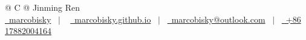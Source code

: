 \documentclass[a4paper,11pt]{article}
\begin{document}
\pagestyle{empty} 


\begin{tabularx}{\linewidth}{@{} C @{}}
\Huge{Jinming Ren} \\[7.5pt]
\href{https://github.com/marcobisky}{\raisebox{-0.05\height}\faGithub\ marcobisky} \ $|$ \ 
\href{https://marcobisky.github.io}{\raisebox{-0.05\height}\faGlobe \ marcobisky.github.io} \ $|$ \ 
\href{mailto:marcobisky@outlook.com}{\raisebox{-0.05\height}\faEnvelope \ marcobisky@outlook.com} \ $|$ \ 
\href{tel:+86 17882004164}{\raisebox{-0.05\height}\faMobile \ +86 17882004164} \\
\end{tabularx}




\vfill
{}
\end{document}
